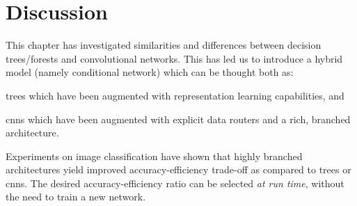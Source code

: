 \documentclass[thesis]{subfiles}
\begin{document}
	\section{Discussion}


This chapter has investigated similarities and differences between decision trees/forests and convolutional networks. This has led us to introduce a hybrid model (namely conditional network) which can be thought both as: 
\begin{enumerate*}[label= (\textbf{\roman*})]
\item trees which have been augmented with representation learning capabilities, and
\item \glspl{cnn} which have been augmented with explicit data routers and a rich, branched architecture.
\end{enumerate*}
Experiments on image classification have shown that highly branched architectures yield improved accuracy-efficiency trade-off as compared to trees or \glspl{cnn}. The desired accuracy-efficiency ratio can be selected \emph{at run time}, without the need to train a new network.
	
\end{document}
